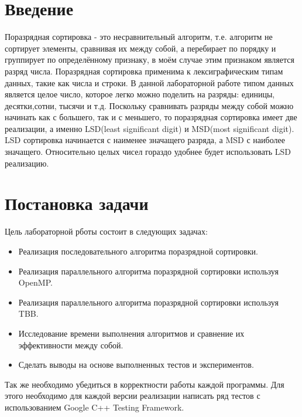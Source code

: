 \documentclass{report}
\begin{document}
\setcounter{page}{2}

\tableofcontents
\newpage

\section*{Введение}
\par Поразрядная сортировка - это несравнительный алгоритм, т.е. алгоритм не сортирует элементы, сравнивая их между собой, а перебирает по порядку и  группирует по определённому признаку, в моём случае этим признаком является разряд числа. Поразрядная сортировка применима к лексиграфическим типам данных, такие как числа и строки. В данной лабораторной работе типом данных является целое число, которое легко можно поделить на разряды: единицы, десятки,сотни, тысячи и т.д. Поскольку сравнивать разряды между собой можно начинать как с большего, так и с меньшего, то поразрядная сортировка имеет две реализации, а именно LSD(least significant digit) и MSD(most significant digit). LSD сортировка начинается с наименее значащего разряда, а MSD с наиболее значащего.  Относительно целых чисел гораздо удобнее будет использовать LSD реализацию.

\newpage

\section*{Постановка задачи}
\par Цель лабораторной рботы состоит в следующих задачах:
\begin{itemize}
\item Реализация последовательного алгоритма поразрядной сортировки.
\item Реализация параллельного алгоритма поразрядной сортировки используя OpenMP.
\item Реализация параллельного алгоритма поразрядной сортировки используя TBB.
\item Исследование времени выполнения алгоритмов и сравнение их эффективности между собой.
\item Сделать выводы на основе выполненных тестов и экспериментов.
\end{itemize}
Так же необходимо убедиться в корректности работы каждой программы. Для этого необходимо для каждой версии реализации написать ряд тестов с использованием Google C++ Testing Framework.
\newpage
\end{document}
